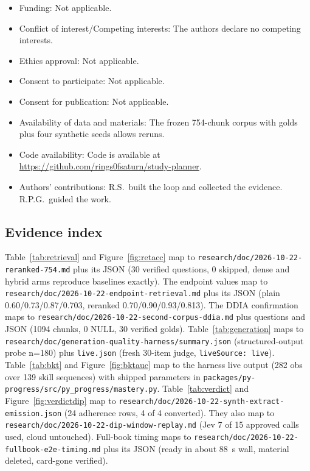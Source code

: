 \documentclass[sn-mathphys,Numbered]{sn-jnl}%
\theoremstyle{thmstyleone}%
\theoremstyle{thmstyletwo}%
\theoremstyle{thmstylethree}%
\begin{document}
\begin{itemize}
\item Funding: Not applicable.
\item Conflict of interest/Competing interests: The authors declare no competing interests.
\item Ethics approval: Not applicable.
\item Consent to participate: Not applicable.
\item Consent for publication: Not applicable.
\item Availability of data and materials: The frozen 754-chunk corpus with golds plus four synthetic seeds allows reruns.
\item Code availability: Code is available at \url{https://github.com/rings0fsaturn/study-planner}.
\item Authors' contributions: R.S.\ built the loop and collected the evidence. R.P.G.\ guided the work.
\end{itemize}

\begin{appendices}

\section{Evidence index}\label{secA1}

Table~\ref{tab:retrieval} and Figure~\ref{fig:retacc} map to \texttt{research/doc/2026-10-22-reranked-754.md} plus its JSON (30 verified questions, 0 skipped, dense and hybrid arms reproduce baselines exactly). The endpoint values map to \texttt{research/doc/2026-10-22-endpoint-retrieval.md} plus its JSON (plain 0.60/0.73/0.87/0.703, reranked 0.70/0.90/0.93/0.813). The DDIA confirmation maps to \texttt{research/doc/2026-10-22-second-corpus-ddia.md} plus questions and JSON (1094 chunks, 0 NULL, 30 verified golds). Table~\ref{tab:generation} maps to \texttt{research/doc/generation-quality-harness/summary.json} (structured-output probe n=180) plus \texttt{live.json} (fresh 30-item judge, \texttt{liveSource: live}). Table~\ref{tab:bkt} and Figure~\ref{fig:bktauc} map to the harness live output (282 obs over 139 skill sequences) with shipped parameters in \texttt{packages/py-progress/src/py\_progress/mastery.py}. Table~\ref{tab:verdict} and Figure~\ref{fig:verdictdip} map to \texttt{research/doc/2026-10-22-synth-extract-emission.json} (24 adherence rows, 4 of 4 converted). They also map to \texttt{research/doc/2026-10-22-dip-window-replay.md} (Jev 7 of 15 approved calls used, cloud untouched). Full-book timing maps to \texttt{research/doc/2026-10-22-fullbook-e2e-timing.md} plus its JSON (ready in about 88~s wall, material deleted, card-gone verified).

\end{appendices}

\end{document}

